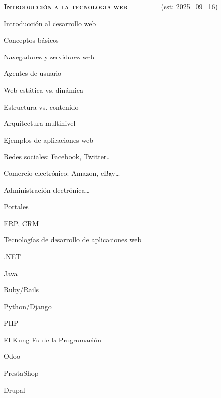 \begin{longenum}
    \item \textbf{\textsc{Introducción a la tecnología web}} \ \ \ \ \ \ \ \ \ (est: 2025\==09\==16)
    \begin{longenum}
        \item Introducción al desarrollo web
        \begin{longenum}
            \item Conceptos básicos
            \begin{longenum}
                \item Navegadores y servidores web
                \item Agentes de usuario
                \item Web estática vs. dinámica
                \item Estructura vs. contenido
                \item Arquitectura multinivel
            \end{longenum}
            \item Ejemplos de aplicaciones web
            \begin{longenum}
                \item Redes sociales: Facebook, Twitter…
                \item Comercio electrónico: Amazon, eBay…
                \item Administración electrónica…
                \item Portales
                \item ERP, CRM
            \end{longenum}
            \item Tecnologías de desarrollo de aplicaciones web
            \begin{longenum}
                \item .NET
                \item Java
                \item Ruby/Rails
                \item Python/Django
                \item PHP
                \item El Kung-Fu de la Programación
                \begin{longenum}
                    \item Odoo
                    \item PrestaShop
                    \item Drupal

\end{longenum}
\end{longenum}
\end{longenum}
\end{longenum}
\end{longenum}
